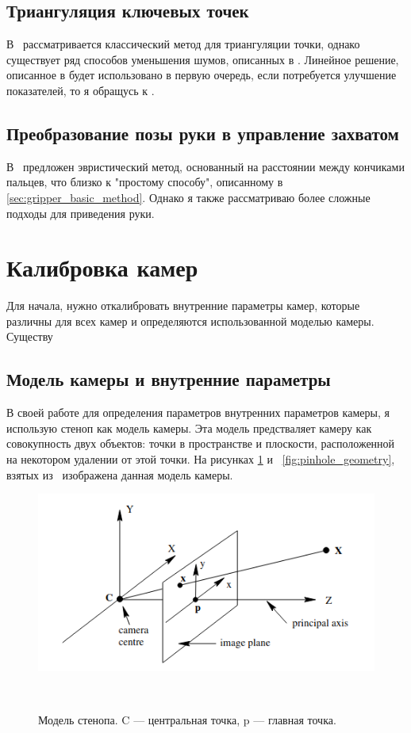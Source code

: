 \documentclass[12pt, a4paper]{article}
\begin{document}
    \subsection{Триангуляция ключевых точек}
        В~\cite{dlt_temugeb} рассматривается классический метод для триангуляции
        точки, однако существует ряд способов уменьшения шумов, описанных в \cite{multiview_cv}.
        Линейное решение, описанное в \cite{dlt_temugeb} будет использовано в первую очередь, если потребуется улучшение показателей, то я обращусь к \cite{multiview_cv}.
    
    \subsection{Преобразование позы руки в управление захватом}
        В~\cite{gesture_control} предложен эвристический метод, основанный на расстоянии между кончиками пальцев, что близко к "простому способу", описанному в \ref{sec:gripper_basic_method}. Однако я также рассматриваю более сложные подходы для приведения руки.
    
\section{Калибровка камер}
Для начала, нужно откалибровать внутренние параметры камер, которые различны
для всех камер и определяются использованной моделью камеры. Существу

\subsection{Модель камеры и внутренние параметры}
\label{sec:camera_model} 
В своей работе для определения параметров внутренних
параметров камеры, я использую стеноп как модель камеры. Эта модель
предстваляет камеру как совокупность двух объектов: точки в пространстве и
плоскости, расположенной на некотором удалении от этой точки. На рисунках
\ref{fig:pinhole_model} и
~\ref{fig:pinhole_geometry}, взятых из~\cite{multiview_cv} изображена данная
модель камеры.

\begin{figure}[h!]
    \includegraphics[scale=1]{images/camera_model/pinhole_visualisation.png}
    \caption{Модель стенопа. C --- центральная точка, p --- главная точка.}
~\label{fig:pinhole_model}
\end{figure}
\end{document}
